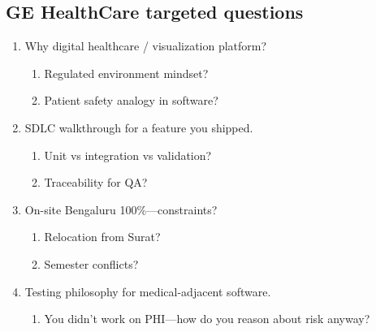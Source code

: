 \documentclass[9pt,a4paper]{article}
\begin{document}
\subsection{GE HealthCare targeted questions}
\begin{enumerate}[label=\textbf{Q\arabic*:}, leftmargin=*]
  \item Why digital healthcare / visualization platform?
  \begin{enumerate}[label=\textit{FU\arabic*:}, leftmargin=2em]
    \item Regulated environment mindset?
    \item Patient safety analogy in software?
  \end{enumerate}
  \item SDLC walkthrough for a feature you shipped.
  \begin{enumerate}[label=\textit{FU\arabic*:}, leftmargin=2em]
    \item Unit vs integration vs validation?
    \item Traceability for QA?
  \end{enumerate}
  \item On-site Bengaluru 100\%---constraints?
  \begin{enumerate}[label=\textit{FU\arabic*:}, leftmargin=2em]
    \item Relocation from Surat?
    \item Semester conflicts?
  \end{enumerate}
  \item Testing philosophy for medical-adjacent software.
  \begin{enumerate}[label=\textit{FU\arabic*:}, leftmargin=2em]
    \item You didn't work on PHI---how do you reason about risk anyway?
  \end{enumerate}
\end{enumerate}
\end{document}
